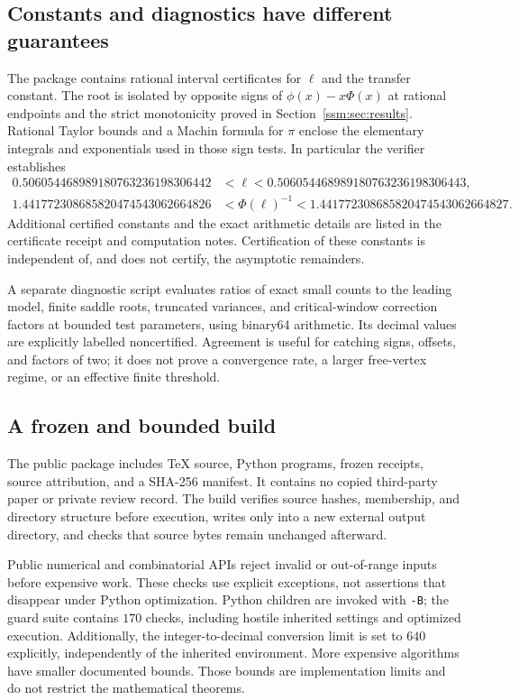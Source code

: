 \subsection{Constants and diagnostics have different guarantees}
The package contains rational interval certificates for $\ell$ and the transfer constant. The root is isolated by opposite signs of $\phi(x)-x\Phi(x)$ at rational endpoints and the strict monotonicity proved in Section~\ref{ssm:sec:results}. Rational Taylor bounds and a Machin formula for $\pi$ enclose the elementary integrals and exponentials used in those sign tests. In particular the verifier establishes
\[
\begin{split}
 0.506054468989180763236198306442
 &<\ell<0.506054468989180763236198306443,\\
 1.441772308685820474543062664826
 &<\Phi(\ell)^{-1}<1.441772308685820474543062664827.
\end{split}
\]
Additional certified constants and the exact arithmetic details are listed in the certificate receipt and computation notes. Certification of these constants is independent of, and does not certify, the asymptotic remainders.

A separate diagnostic script evaluates ratios of exact small counts to the leading model, finite saddle roots, truncated variances, and critical-window correction factors at bounded test parameters, using binary64 arithmetic. Its decimal values are explicitly labelled noncertified. Agreement is useful for catching signs, offsets, and factors of two; it does not prove a convergence rate, a larger free-vertex regime, or an effective finite threshold.

\subsection{A frozen and bounded build}
The public package includes TeX source, Python programs, frozen receipts, source attribution, and a SHA-256 manifest. It contains no copied third-party paper or private review record. The build verifies source hashes, membership, and directory structure before execution, writes only into a new external output directory, and checks that source bytes remain unchanged afterward.

Public numerical and combinatorial APIs reject invalid or out-of-range inputs before expensive work. These checks use explicit exceptions, not assertions that disappear under Python optimization. Python children are invoked with \texttt{-B}; the guard suite contains $170$ checks, including hostile inherited settings and optimized execution. Additionally, the integer-to-decimal conversion limit is set to $640$ explicitly, independently of the inherited environment. More expensive algorithms have smaller documented bounds. Those bounds are implementation limits and do not restrict the mathematical theorems.

